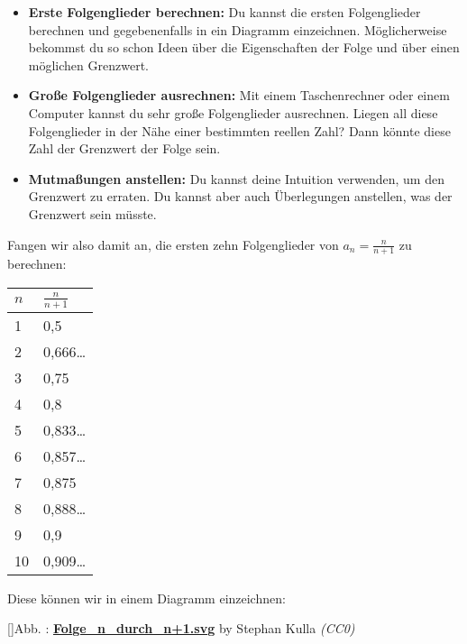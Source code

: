 \documentclass[fontsize=9pt,
               parskip=half-,
               DIV=14,
               listof=chapterentry,
               tocflat]{scrbook}
\newcounter{imagelabel}
\begin{document}
\begin{itemize}
\item \textbf{Erste Folgenglieder berechnen:} Du kannst die ersten Folgenglieder berechnen und gegebenenfalls in ein Diagramm einzeichnen. Möglicherweise bekommst du so schon Ideen über die Eigenschaften der Folge und über einen möglichen Grenzwert.
\item \textbf{Große Folgenglieder ausrechnen:} Mit einem Taschenrechner oder einem Computer kannst du sehr große Folgenglieder ausrechnen. Liegen all diese Folgenglieder in der Nähe einer bestimmten reellen Zahl? Dann könnte diese Zahl der Grenzwert der Folge sein.
\item \textbf{Mutmaßungen anstellen:} Du kannst deine Intuition verwenden, um den Grenzwert zu erraten. Du kannst aber auch Überlegungen anstellen, was der Grenzwert sein müsste.
\end{itemize}

Fangen wir also damit an, die ersten zehn Folgenglieder von $a_{n}={\tfrac {n}{n+1}}$ zu berechnen:


\renewcommand{\arraystretch}{1.5}

\begin{longtabu} to \linewidth {X[l]X[l]} \\ \toprule 
$n$ & ${\tfrac {n}{n+1}}$ \\ 
 & 0,5 \\ 
2 & 0,666… \\ 
3 & 0,75 \\ 
4 & 0,8 \\ 
5 & 0,833… \\ 
6 & 0,857… \\ 
7 & 0,875 \\ 
8 & 0,888… \\ 
9 & 0,9 \\ 
10 & 0,909… \\ 
\bottomrule
\end{longtabu}
\renewcommand{\arraystretch}{1.0}
Diese können wir in einem Diagramm einzeichnen:

[]{Abb. : \protect\href{https://commons.wikimedia.org/wiki/File:Folge_n_durch_n+1.svg}{\textbf{Folge\allowbreak\_n\allowbreak\_durch\allowbreak\_n+1.svg}} by Stephan Kulla \textit{(CC0)}}\begin{center}
\end{center}
\end{document}
